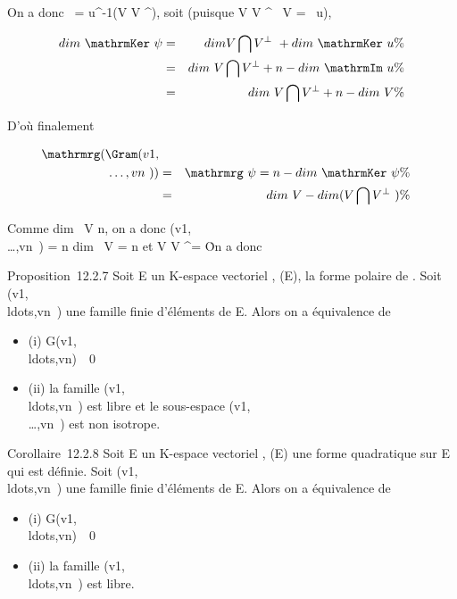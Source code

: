 On a donc \mathrmKer~\psi =
u^-1(V \bigcap V ^\bot), soit (puisque V \bigcap V ^\bot\subset~
V = \mathrmIm~u),

\begin{align*} dim~
\mathrmKer~\psi& =&
dim V \bigcap V ^\bot~
+ dim~
\mathrmKer~u \%&
\\ & =& dim~ V
\bigcap V ^\bot + n - dim~
\mathrmIm~u\%&
\\ & =& dim~ V
\bigcap V ^\bot + n - dim~ V \%&
\\ \end{align*}

D'où finalement

\begin{align*}
\mathrmrg(\Gram(v1,\\\ldots,vn~))&
=& \mathrmrg~\psi = n
- dim~
\mathrmKer~\psi \%&
\\ & =& dim~ V
- dim (V \bigcap V ^\bot~)\%&
\\ \end{align*}

Comme dim~ V \leq n, on a donc
\mathrmrg\Gram(v1,\\\ldots,vn~)
= n \Leftrightarrow dim~ V = n et
V \bigcap V ^\bot = \0\. On a donc

Proposition~12.2.7 Soit E un K-espace vectoriel , \Phi \inQ(E), \phi la forme
polaire de \Phi. Soit
(v1,\\ldots,vn~)
une famille finie d'éléments de E. Alors on a équivalence de

\begin{itemize}
\itemsep1pt\parskip0pt
\item
  (i)
  G(v1,\\ldots,vn)\mathrel\neq~~0
\item
  (ii) la famille
  (v1,\\ldots,vn~)
  est libre et le sous-espace
  \mathrmVect(v1,\\\ldots,vn~)
  est non isotrope.
\end{itemize}

Corollaire~12.2.8 Soit E un K-espace vectoriel , \Phi \inQ(E) une forme
quadratique sur E qui est définie. Soit
(v1,\\ldots,vn~)
une famille finie d'éléments de E. Alors on a équivalence de

\begin{itemize}
\itemsep1pt\parskip0pt
\item
  (i)
  G(v1,\\ldots,vn)\mathrel\neq~~0
\item
  (ii) la famille
  (v1,\\ldots,vn~)
  est libre.
\end{itemize}

